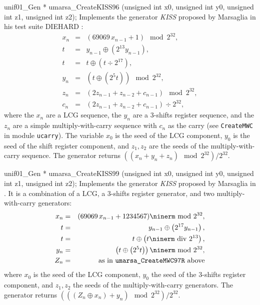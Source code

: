 unif01_Gen * umarsa_CreateKISS96 (unsigned int x0, unsigned int y0,
                                  unsigned int z1, unsigned int z2);
\endcode
 \tab Implements the generator {\it KISS}
 proposed by Marsaglia in his test suite
  DIEHARD \cite{rMAR96a}:
  \begin {eqnarray*}
   x_n &=& \left(69069\,x_{n-1} + 1\right) \mod 2^{32}, \\
   t &=& y_{n-1}\oplus \left(2^{13} y_{n-1}\right), \\
   t &=& t\oplus \left(t \div 2^{17}\right), \\
   y_n &=& \left(t\oplus  \left(2^{5} t\right)\right) \mod 2^{32}, \\
   z_n &=& \left(2z_{n-1}+ z_{n-2} + c_{n-1}\right) \mod 2^{32}, \\
   c_n &=& (2z_{n-1} + z_{n-2} + c_{n-1}) \div 2^{32},
  \end {eqnarray*}
  where the $x_n$ are a LCG sequence, the $y_n$ are a 3-shifts register
  sequence, and the $z_n$ are a simple multiply-with-carry sequence
  with $c_n$ as the carry (see {\tt CreateMWC} in module  {\tt ucarry}).
  The variable $x_0$ is the seed of the LCG component,  $y_0$ is the seed
  of the shift register component, and $z_1, z_2$ are the seeds of
  the  multiply-with-carry sequence. The generator returns
  $\left((x_n + y_n + z_n) \mod 2^{32}\right) / 2^{32}$.
  \endtab
\code


unif01_Gen * umarsa_CreateKISS99 (unsigned int x0, unsigned int y0,
                                  unsigned int z1, unsigned int z2);
\endcode
 \tab Implements the generator {\it KISS} proposed by Marsaglia in
 \cite{rMAR99a}. It is a combination of a LCG, a 3-shifts register generator,
%
  and two multiply-with-carry generators:
  \begin {eqnarray*}
   x_n &=& (69069\,x_{n-1} + 1234567) \mod 2^{32}, \\
   t &=& y_{n-1}\oplus \left(2^{17} y_{n-1} \right), \\
   t &=& t\oplus \left(t \div 2^{13}\right), \\
   y_n &=& \left( t\oplus  \left(2^{5} t \right)\right) \mod 2^{32}, \\
   Z_n &=& \mbox{as in {\tt umarsa\_CreateMWC97R} above}
  \end {eqnarray*}
   where $x_0$ is the seed of the LCG component, $y_0$ the seed of the
  3-shifts register component, and $z_1, z_2$ the seeds of the
  multiply-with-carry generators. The generator returns
   $\left( ((Z_n \oplus x_n) + y_n) \mod 2^{32}\right)/2^{32}$.
  \endtab
\code


